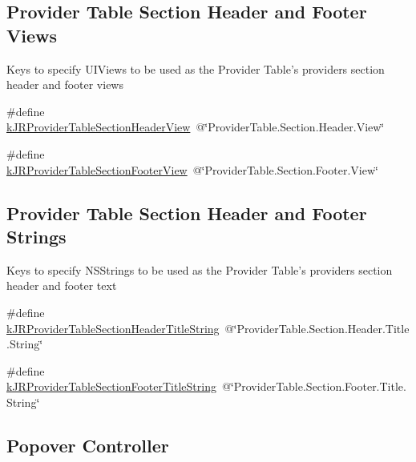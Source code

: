 \subsection*{Provider Table Section Header and Footer Views}
\label{_amgrp0087c3b750e6b14cf3b110df546a77d4}
 \label{group__custom_interface_tableSectionViews}
\hypertarget{group__custom_interface_tableSectionViews}{}


Keys to specify UIViews to be used as the Provider Table's providers section header and footer views \begin{DoxyCompactItemize}
\item 
\#define \hyperlink{group__custom_interface_gaaff8ebdd2b9badb1d0a019a71d47db46}{kJRProviderTableSectionHeaderView}~@\char`\"{}ProviderTable.Section.Header.View\char`\"{}
\item 
\#define \hyperlink{group__custom_interface_ga984c096e9258dea402a1c27ae8bb6c8f}{kJRProviderTableSectionFooterView}~@\char`\"{}ProviderTable.Section.Footer.View\char`\"{}
\end{DoxyCompactItemize}
\subsection*{Provider Table Section Header and Footer Strings}
\label{_amgrp04b2524ada266b7d80839ac3b6e6ae59}
 \label{group__custom_interface_tableSectionStrings}
\hypertarget{group__custom_interface_tableSectionStrings}{}


Keys to specify NSStrings to be used as the Provider Table's providers section header and footer text \begin{DoxyCompactItemize}
\item 
\#define \hyperlink{group__custom_interface_ga667a6c955993ec24292875f319a7d763}{kJRProviderTableSectionHeaderTitleString}~@\char`\"{}ProviderTable.Section.Header.Title.String\char`\"{}
\item 
\#define \hyperlink{group__custom_interface_ga72e63105251e7d4d6a363e279c2bf775}{kJRProviderTableSectionFooterTitleString}~@\char`\"{}ProviderTable.Section.Footer.Title.String\char`\"{}
\end{DoxyCompactItemize}
\subsection*{Popover Controller}
\label{_amgrp1ade27130a70fa12983df9eb98cfa3b2}
 \label{group__custom_interface_popover}
\hypertarget{group__custom_interface_popover}{}


